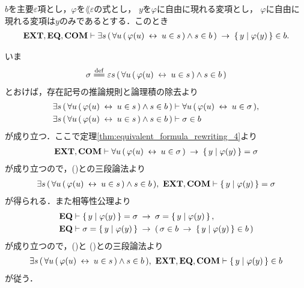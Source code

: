 	\begin{screen}
		\begin{thm}
		\label{thm:equivalent_formula_rewriting_10}
			$b$を主要$\varepsilon$項とし，$\varphi$を$\lang{\varepsilon}$の式とし，
			$y$を$\varphi$に自由に現れる変項とし，
			$\varphi$に自由に現れる変項は$y$のみであるとする．このとき
			\begin{align}
				\mbox{{\bf EXT}},\mbox{{\bf EQ}},\mbox{\bf COM} \vdash \exists s\, (\, \forall u\, (\, \varphi(u) \hspace{0.25em}\leftrightarrow\hspace{0.25em} u \in s\, ) \wedge s \in b\, ) \hspace{0.25em}\rightarrow\hspace{0.25em} \left\{\, y \mid \varphi(y)\, \right\} \in b.
			\end{align}
		\end{thm}
	\end{screen}
	
	\begin{sketch}
		いま
		\begin{align}
			\sigma \defeq \varepsilon s\, (\, \forall u\, (\, \varphi(u) \lrarrow u \in s\, ) \wedge s \in b\, )
		\end{align}
		とおけば，存在記号の推論規則と論理積の除去より
		\begin{align}
			\exists s\, (\, \forall u\, (\, \varphi(u) \hspace{0.25em}\leftrightarrow\hspace{0.25em} u \in s\, ) \wedge s \in b\, )
			&\vdash \forall u\, (\, \varphi(u) \hspace{0.25em}\leftrightarrow\hspace{0.25em} u \in \sigma\, ), 
			\label{fom:equivalent_formula_rewriting_10_1} \\
			\exists s\, (\, \forall u\, (\, \varphi(u) \hspace{0.25em}\leftrightarrow\hspace{0.25em} u \in s\, ) \wedge s \in b\, )
			&\vdash \sigma \in b
			\label{fom:equivalent_formula_rewriting_10_2}
		\end{align}
		が成り立つ．ここで定理\ref{thm:equivalent_formula_rewriting_4}より
		\begin{align}
			\mbox{{\bf EXT}},\mbox{\bf COM} \vdash \forall u\, (\, \varphi(u) \hspace{0.25em}\leftrightarrow\hspace{0.25em} u \in \sigma\, )
			\hspace{0.25em}\rightarrow\hspace{0.25em} \left\{\, y \mid \varphi(y)\, \right\} = \sigma
		\end{align}
		が成り立つので，()との三段論法より
		\begin{align}
			\exists s\, (\, \forall u\, (\, \varphi(u) \hspace{0.25em}\leftrightarrow\hspace{0.25em} u \in s\, ) \wedge s \in b\, ),\ \mbox{{\bf EXT}},\mbox{\bf COM} \vdash \left\{\, y \mid \varphi(y)\, \right\} = \sigma
			\label{fom:equivalent_formula_rewriting_10_3}
		\end{align}
		が得られる．また相等性公理より
		\begin{align}
			\mbox{{\bf EQ}} &\vdash \left\{\, y \mid \varphi(y)\, \right\} = \sigma \hspace{0.25em}\rightarrow\hspace{0.25em} \sigma = \left\{\, y \mid \varphi(y)\, \right\}, \\
			\mbox{{\bf EQ}} &\vdash \sigma = \left\{\, y \mid \varphi(y)\, \right\} \hspace{0.25em}\rightarrow\hspace{0.25em}
			(\, \sigma \in b \hspace{0.25em}\rightarrow\hspace{0.25em} \left\{\, y \mid \varphi(y)\, \right\} \in b\, )
		\end{align}
		が成り立つので，()と
		()との三段論法より
		\begin{align}
			\exists s\, (\, \forall u\, (\, \varphi(u) \hspace{0.25em}\leftrightarrow\hspace{0.25em} u \in s\, ) \wedge s \in b\, ),\ \mbox{{\bf EXT}},\mbox{{\bf EQ}},\mbox{\bf COM} \vdash \left\{\, y \mid \varphi(y)\, \right\} \in b
		\end{align}
		が従う．
		\QED
	\end{sketch}
	
